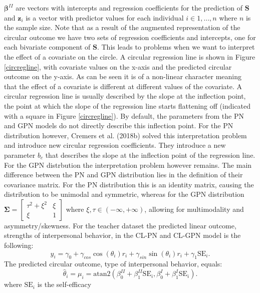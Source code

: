 \documentclass[man,mask]{apa6}
\begin{document}
\(\boldsymbol{\beta}^{II}\) are vectors with intercepts and regression
coefficients for the prediction of \(\boldsymbol{S}\) and \(\boldsymbol{z}_i\) is a
vector with predictor values for each individual \(i \in 1, \dots, n\) where \(n\)
is the sample size. Note that as a result of the augmented representation of the
circular outcome we have two sets of regression coefficients and intercepts, one
for each bivariate component of \(\boldsymbol{S}\). This leads to problems when we
want to interpret the effect of a covariate on the circle. A circular regression
line is shown in Figure \ref{circregline}, with covariate values on the x-axis
and the predicted circular outcome on the y-axis. As can be seen it is of a
non-linear character meaning that the effect of a covariate is different at
different values of the covariate. A circular regression line is usually
described by the slope at the inflection point, the point at which the slope of
the regression line starts flattening off (indicated with a square in Figure
\ref{circregline}). By default, the parameters from the PN and GPN models do not
directly describe this inflection point. For the PN distribution however,
Cremers et al. (2018b) solved this interpretation problem and introduce new
circular regression coefficients. They introduce a new parameter \(b_c\) that
describes the slope at the inflection point of the regression line. For the
GPN distrbution the interpretation problem however remains.\newline
\indent The main difference between the PN and GPN distribution lies in the
definition of their covariance matrix. For the PN distribution this is an
identity matrix, causing the distribution to be unimodal and symmetric, whereas
for the GPN distribution \(\boldsymbol{\Sigma} = \begin{bmatrix} \tau^2 + \xi^2 & \xi\\ \xi & 1 \end{bmatrix}\) where \(\xi,\tau \in (-\infty, +\infty)\), allowing for multimodality and
asymmetry/skewness.\newline
\indent For the teacher dataset the predicted linear outcome, strengths of
interpersonal behavior, in the CL-PN and CL-GPN model is the following:
\[\hat{y}_i = \gamma_0 + \gamma_{cos}\cos(\theta_i)r_i +
\gamma_{sin}\sin(\theta_i)r_i + \gamma_1\text{SE}_i.\] The predicted circular
outcome, type of interpersonal behavior, equals: \[\hat{\theta}_i = \mu_i =
\mbox{atan2} (\beta_0^{II} + \beta_1^{II}\text{SE}_i, \beta_0^{I} +
\beta_1^{I}\text{SE}_i).\] \noindent where \(\text{SE}_i\) is the self-efficacy
\end{document}
